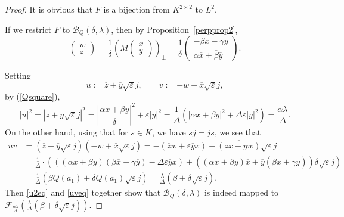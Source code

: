\documentclass[10pt,a4paper]{amsart}
\begin{document}
\begin{proof}
It is obvious that $F$ is a bijection from $K^{2\times 2}$ to $L^2$.

If we restrict $F$ to $\mathcal B_Q(\delta,\lambda)$, then by Proposition~\ref{perpprop2},
\[
\begin{pmatrix}
w \\ z
\end{pmatrix} = \frac{1}{\delta}\left(M\begin{pmatrix}
x \\ y
\end{pmatrix}\right)_{\perp} = \frac{1}{\delta} \begin{pmatrix}
-\beta \overline{x} - \gamma \overline{y}\\ \alpha \overline{x} + \overline{\beta} \overline{y}
\end{pmatrix}.
\]


Setting
\[
u:=\overline z+\overline y\sqrt{\varepsilon}j,\qquad v:=-w+\overline x\sqrt{\varepsilon}j,
\]
by (\ref{Qsquare}),
\begin{equation}\label{u2eq}
|u|^2=|\overline z+\overline y\sqrt{\varepsilon}j|^2=\left|\frac{\alpha x+\beta y}{\overline\delta}\right|^2+\varepsilon |\overline y|^2=\frac1\Delta\left(|\alpha x+\beta y|^2+\Delta\varepsilon|y|^2\right)=\frac{\alpha\lambda}{\Delta}.
\end{equation}
On the other hand, using that for $s\in K$, we have $sj=j\overline s$, we see that
\begin{equation}\label{uveq}
\begin{split}
uv&=(\overline z+\overline y\sqrt{\varepsilon}j)(-w+\overline x\sqrt{\varepsilon}j)=-(\overline zw+\varepsilon\overline yx)+\overline{(zx-yw)}\sqrt{\varepsilon}j\\ 
&=\frac1\Delta\cdot\left(((\alpha x+\beta y)(\beta\overline x+\gamma\overline y)-\Delta\varepsilon\overline y x)+((\alpha x+\beta y)\overline x+\overline y(\overline \beta x+\gamma y))\delta\sqrt{\varepsilon}j\right) \\ 
&=\frac1\Delta(\beta Q(a_1) +\delta Q(a_1)\sqrt{\varepsilon}j)=\frac\lambda\Delta(\beta+\delta\sqrt{\varepsilon}j).
\end{split}
\end{equation}
Then \eqref{u2eq} and \eqref{uveq} together show that $\mathcal B_Q(\delta,\lambda)$ is indeed mapped to $\mathcal F_{\frac{\alpha\lambda}{\Delta}}\left(\frac{\lambda}{\Delta}(\beta+\delta\sqrt{\varepsilon}j)\right)$.


\end{proof}
\end{document}
